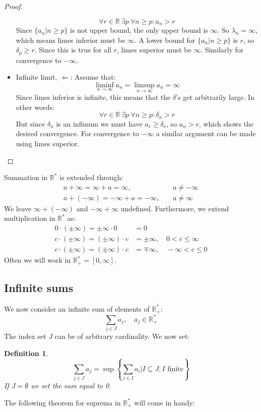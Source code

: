 \documentclass[12pt, a4paper]{article}
\newtheorem{definition}{Definition}[section]
\numberwithin{equation}{section}
\begin{document}
\begin{proof}
\begin{itemize}
\begin{equation}
\forall r\in\mathbb{R}\ \exists p\ \forall n\ge p: a_n>r
\end{equation}
Since $\{a_n|n\ge p\}$ is not upper bound, the only upper bound is $\infty$. So $\lambda_n=\infty$, which means limes inferior must be $\infty$. A lower bound for $\{a_n|n\ge p\}$ is $r$, so $\delta_p\ge r$. Since this is true for all $r$, limes superior must be $\infty$. Similarly for convergence to $-\infty$.
\item Infinite limit, $\Leftarrow$: Assume that:
\begin{equation}
\liminf_{n\rightarrow\infty}a_n=\limsup_{n\rightarrow\infty}a_n=\infty
\end{equation}
Since limes inferior is infinite, this means that the $\delta$'s get arbitrarily large. In other words:
\begin{equation}
\forall r\in\mathbb{R}\ \exists p\ \forall n\ge p:\delta_n>r
\end{equation}
But since $\delta_n$ is an infimum we must have $a_r\ge\delta_r$, so $a_n>r$, which shows the desired convergence. For convergence to $-\infty$ a similar argument can be made using limes superior.
\end{itemize}
\end{proof}

Summation in $\mathbb{R}^*$ is extended through:
\begin{align}
a+\infty = \infty+a = \infty,\quad & a\neq -\infty\\
a+(-\infty)=-\infty + a = -\infty,\quad & a\neq\infty
\end{align}
We leave $\infty+(-\infty)$ and $-\infty+\infty$ undefined. Furthermore, we extend multiplication in $\mathbb{R}^*$ as:
\begin{align}
0\cdot(\pm\infty)=\pm\infty\cdot 0&= 0\\
c\cdot(\pm\infty)=(\pm\infty)\cdot c &=\pm\infty,\quad 0<c\le\infty\\
c\cdot(\pm\infty)=(\pm\infty)\cdot c &=\mp\infty,\quad -\infty<c\le 0
\end{align}
Often we will work in $\mathbb{R}_+^*=[0,\infty]$.

\subsection{Infinite sums}
We now consider an infinite sum of elements of $\mathbb{R}_+^*$:
\begin{equation}
\sum_{j\in J}a_j,\quad a_j\in\mathbb{R}_+^*
\end{equation}
The index set $J$ can be of arbitrary cardinality. We now set:
\begin{definition}
\begin{equation}
\sum_{j\in J}a_j=\sup\left\{\sum_{i\in I}a_i|I\subseteq J, I\textrm{ finite}\right\}
\end{equation}
If $J=\emptyset$ we set the sum equal to 0.
\end{definition}
The following theorem for suprema in $\mathbb{R}_+^*$ will come in handy:
\end{document}
